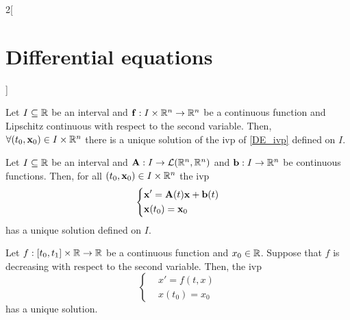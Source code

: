 \documentclass[../../../main.tex]{subfiles}
\begin{document}
\begin{multicols}{2}[\section{Differential equations}]
\begin{corollary}
  \end{corollary}
  \begin{prop}
    Let $I\subseteq\mathbb{R}$ be an interval and $\boldsymbol{\mathrm{f}}:I\times\mathbb{R}^n\rightarrow\mathbb{R}^n$ be a continuous function and Lipschitz continuous with respect to the second variable. Then, $\forall(t_0,\boldsymbol{\mathrm{x}}_0)\in I\times\mathbb{R}^n$ there is a unique solution of the ivp of \cref{DE_ivp} defined on $I$.
  \end{prop}
  \begin{corollary}
    Let $I\subseteq\mathbb{R}$ be an interval and $\boldsymbol{\mathrm{A}}:I\rightarrow\mathcal{L}(\mathbb{R}^n,\mathbb{R}^n)$ and $\boldsymbol{\mathrm{b}}:I\rightarrow\mathbb{R}^n$ be continuous functions. Then, for all $(t_0,\boldsymbol{\mathrm{x}}_0)\in I\times\mathbb{R}^n$ the ivp
    $$
      \left\{
      \begin{aligned}
         & \boldsymbol{\mathrm{x}}'=\boldsymbol{\mathrm{A}}(t)\boldsymbol{\mathrm{x}}+\boldsymbol{\mathrm{b}}(t) \\
         & \boldsymbol{\mathrm{x}}(t_0)=\boldsymbol{\mathrm{x}}_0
      \end{aligned}
      \right.
    $$
    has a unique solution defined on $I$.
  \end{corollary}
  \begin{theorem}
    Let $f:[t_0,t_1]\times\mathbb{R}\rightarrow\mathbb{R}$ be a continuous function and $x_0\in \mathbb{R}$. Suppose that $f$ is decreasing with respect to the second variable. Then, the ivp
    \begin{equation*}
      \left\{
      \begin{aligned}
         & x'=f(t,x)  \\
         & x(t_0)=x_0
      \end{aligned}
      \right.
    \end{equation*}
    has a unique solution.
  \end{theorem}

\end{multicols}
\end{document}

